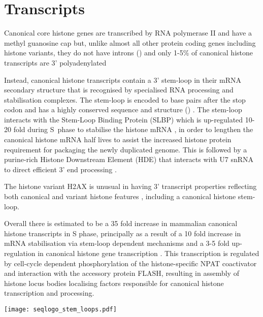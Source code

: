 \section{Transcripts}
  
	Canonical core histone genes are transcribed by RNA polymerase II 
	and have a methyl guanosine cap 
	but, unlike almost all other protein coding genes including histone variants, 
	they do not have introns () 
	and only 1-5\% of canonical histone transcripts are 3' polyadenylated 

	Instead, canonical histone transcripts contain a 3' stem-loop in their mRNA secondary structure 
	that is recognised by specialised RNA processing and stabilisation complexes.
	The stem-loop is encoded \StemLoopStart{} to \StemLoopEnd{} base pairs after the stop codon 
	and has a highly conserved sequence and structure () \citep{stem-loop-structure}.
	The stem-loop interacts with the Stem-Loop Binding Protein (SLBP) 
	which is up-regulated 10-20 fold during S~phase to stabilise the histone mRNA \citep{SLBP-regulation}, 
	in order to lengthen the canonical histone mRNA half lives 
	to assist the increased histone protein requirement for packaging the newly duplicated genome.
	This is followed by a purine-rich Histone Downstream Element (HDE) 
	that interacts with U7 snRNA to direct efficient 3' end processing \citep{HDE-sequence}.

	The histone variant H2AX is unusual in having 3' transcript properties reflecting
	both canonical and variant histone features \citep{HTwoAX-transcripts}, including a canonical histone stem-loop. 

	Overall there is estimated to be a 35 fold increase in mammalian canonical histone transcripts in S phase,
	principally as a result of a 10 fold increase in mRNA stabilisation via stem-loop dependent mechanisms 
	and a 3-5 fold up-regulation in canonical histone gene transcription . 
	This transcription is regulated by cell-cycle dependent phosphorylation of the histone-specific NPAT coactivator 
	and interaction with the accessory protein FLASH, 
	resulting in assembly of histone locus bodies localising factors responsible for canonical histone transcription and processing.

    \begin{figure*}
      \centering
      \texttt{[image: seqlogo\_stem\_loops.pdf]}
      \label{fig:stem-loop-seqlogo}
    \end{figure*}
